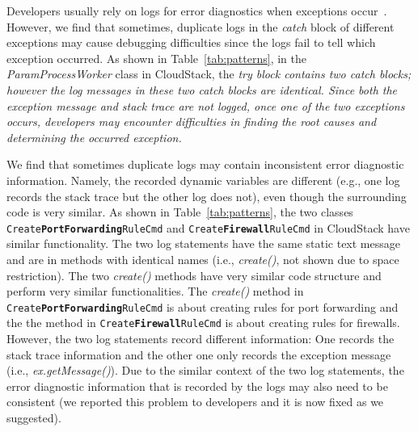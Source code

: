 
 Developers usually rely on logs for error diagnostics when exceptions occur~\cite{Yuan:2014:STP:2685048.2685068}. However, we find that sometimes, duplicate logs in the {\em catch} block of different exceptions may cause debugging difficulties since the logs fail to tell which exception occurred. As shown in Table~\ref{tab:patterns}, in the {\em ParamProcessWorker} class in CloudStack, the \em{try} block contains two {\em catch} blocks; however the log messages in these two {\em catch} blocks are identical. Since both the exception message and stack trace are not logged, once one of the two exceptions occurs, developers may encounter difficulties in finding the root causes and determining the occurred exception. %

 We find that sometimes duplicate logs may contain inconsistent error diagnostic information. Namely, the recorded dynamic variables are different (e.g., one log records the stack trace but the other log does not), even though the surrounding code is very similar. As shown in Table~\ref{tab:patterns}, the two classes {\tt\small Create\textbf{PortForwarding}RuleCmd} and {\tt\small Create\textbf{Firewall}RuleCmd} in CloudStack have similar functionality. The two log statements have the same static text message and are in methods with identical names (i.e., {\em create()}, not shown due to space restriction). The two {\em create()} methods have very similar code structure and perform very similar functionalities. The {\em create()} method in {\tt\small Create\textbf{PortForwarding}RuleCmd} is about creating rules for port forwarding and the the method in {\tt\small Create\textbf{Firewall}RuleCmd} is about creating rules for firewalls. However, the two log statements record different information: One records the stack trace information and the other one only records the exception message (i.e., {\em ex.getMessage()}). Due to the similar context of the two log statements, the error diagnostic information that is recorded by the logs may also need to be consistent (we reported this problem to developers and it is now fixed as we suggested). %


